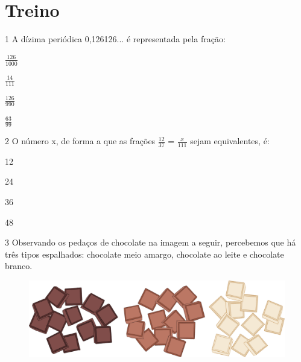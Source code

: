 
\section*{Treino}

\num{1} A dízima periódica 0,126126... é representada pela fração:

\begin{escolha}

\item $\frac{126}{1000}$
\item $\frac{14}{111}$
\item $\frac{126}{990}$
\item $\frac{63}{99}$

\end{escolha}

\num{2} O número x, de forma a que as frações $\frac{12}{37}$ = $\frac{x}{111}$ sejam equivalentes, é:

\begin{escolha}

\item 12
\item 24
\item 36
\item 48

\end{escolha}

\pagebreak
\num{3} Observando os pedaços de chocolate na imagem a seguir, percebemos 
que há três tipos espalhados: chocolate meio amargo, chocolate ao leite e
chocolate branco. 

\begin{figure}[htpb!]
\centering
\includegraphics[width=.5\textwidth]{./ilustras-mat/modulo_3-treino_3.png}
\end{figure}



